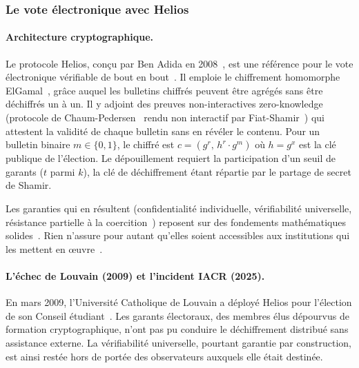 \subsubsection{Le vote \'electronique avec Helios}
\label{subsubsec:cas_helios}
\begin{sloppypar}

\paragraph{Architecture cryptographique.}
\label{par:helios_architecture}

Le protocole Helios, con\c{c}u par Ben Adida en 2008~\cite{Adida08}, est
une r\'ef\'erence pour le vote \'electronique v\'erifiable de bout en bout~\cite{Benaloh94,Lindeman12}. Il
emploie le chiffrement homomorphe ElGamal~\cite{ElGamal85}, gr\^ace auquel les
bulletins chiffr\'es peuvent \^etre agr\'eg\'es sans \^etre d\'echiffr\'es un \`a un. Il y adjoint des
preuves non-interactives zero-knowledge
(protocole de Chaum-Pedersen~\cite{ChaumPedersen92} rendu non interactif par Fiat-Shamir~\cite{FiatShamir87})
qui attestent la validit\'e de chaque bulletin sans en r\'ev\'eler le contenu.
Pour un bulletin binaire $m \in \{0,1\}$, le chiffr\'e est
$c = (g^r,\, h^r \cdot g^m)$ o\`u $h = g^x$ est la cl\'e publique
de l'\'election. Le d\'epouillement requiert la participation d'un seuil de garants ($t$
parmi $k$), la cl\'e de d\'echiffrement \'etant r\'epartie par le partage de secret de Shamir.

Les garanties qui en r\'esultent (confidentialit\'e individuelle, v\'erifiabilit\'e
universelle, r\'esistance partielle \`a la coercition~\cite{Benaloh94}) reposent
sur des fondements math\'ematiques solides~\cite{CramerDamgardSchoenmakers}. Rien
n'assure pour autant qu'elles soient accessibles aux institutions qui les
mettent en \oe uvre~\cite{Bonneau12,Whitten99}.

\paragraph{L'\'echec de Louvain (2009) et l'incident IACR (2025).}
\label{par:echec_louvain}

En mars 2009, l'Universit\'e Catholique de Louvain a d\'eploy\'e Helios pour
l'\'election de son Conseil \'etudiant~\cite{Adida09UCL}. Les garants
\'electoraux, des membres \'elus d\'epourvus de formation cryptographique, n'ont
pas pu conduire le d\'echiffrement distribu\'e sans assistance externe. La
v\'erifiabilit\'e universelle, pourtant garantie par construction, est ainsi
rest\'ee hors de port\'ee des observateurs auxquels elle \'etait destin\'ee.


\end{sloppypar}
